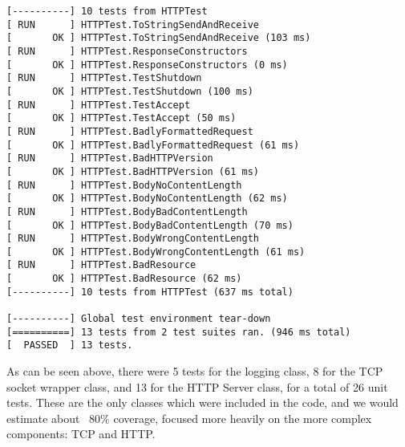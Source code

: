 \begin{verbatim}
[----------] 10 tests from HTTPTest
[ RUN      ] HTTPTest.ToStringSendAndReceive
[       OK ] HTTPTest.ToStringSendAndReceive (103 ms)
[ RUN      ] HTTPTest.ResponseConstructors
[       OK ] HTTPTest.ResponseConstructors (0 ms)
[ RUN      ] HTTPTest.TestShutdown
[       OK ] HTTPTest.TestShutdown (100 ms)
[ RUN      ] HTTPTest.TestAccept
[       OK ] HTTPTest.TestAccept (50 ms)
[ RUN      ] HTTPTest.BadlyFormattedRequest
[       OK ] HTTPTest.BadlyFormattedRequest (61 ms)
[ RUN      ] HTTPTest.BadHTTPVersion
[       OK ] HTTPTest.BadHTTPVersion (61 ms)
[ RUN      ] HTTPTest.BodyNoContentLength
[       OK ] HTTPTest.BodyNoContentLength (62 ms)
[ RUN      ] HTTPTest.BodyBadContentLength
[       OK ] HTTPTest.BodyBadContentLength (70 ms)
[ RUN      ] HTTPTest.BodyWrongContentLength
[       OK ] HTTPTest.BodyWrongContentLength (61 ms)
[ RUN      ] HTTPTest.BadResource
[       OK ] HTTPTest.BadResource (62 ms)
[----------] 10 tests from HTTPTest (637 ms total)

[----------] Global test environment tear-down
[==========] 13 tests from 2 test suites ran. (946 ms total)
[  PASSED  ] 13 tests. \end{verbatim}

\normalsize

As can be seen above, there were 5 tests for the logging class, 8 for the TCP socket wrapper class, and 13 for the HTTP Server class, for a total of 26 unit tests. These are the only classes which were included in the code, and we would estimate about ~80\% coverage, focused more heavily on the more complex components: TCP and HTTP.
